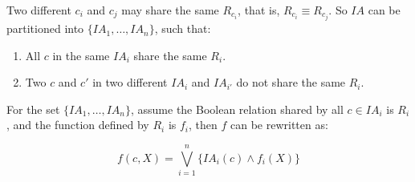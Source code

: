 \documentclass[journal]{IEEEtran}
\begin{document}
%
%
%
%
%
%
Two different $c_i$ and $c_j$ may share the same $R_{c_i}$,
that is,
$R_{c_i}\equiv R_{c_j}$.
%
So $IA$ can be partitioned into $\{IA_1,\dots,IA_n\}$,
such that:
\begin{enumerate}
 \item All $c$ in the same $IA_i$ share the same $R_i$.
 \item Two $c$ and $c'$ in two different $IA_i$ and $IA_{i'}$ do not share the same $R_i$.
\end{enumerate}

For the set $\{IA_1,\dots,IA_n\}$,
assume the Boolean relation shared by all $c\in IA_i$ is $R_i$,
and the function defined by $R_i$ is $f_i$,
then $f$ can be rewritten as:

\begin{equation}\label{equ_fdfrewagain}
f(c,X)=\bigvee _{i=1}^{n} \{IA_i(c)\wedge f_i(X)\}
\end{equation}

%
\end{document}
